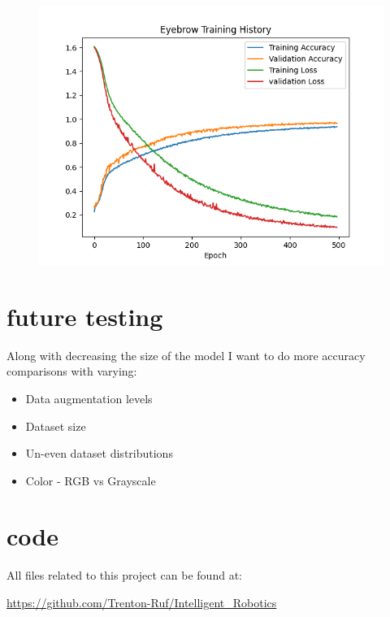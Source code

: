 \documentclass[11pt]{scrartcl} %
\begin{document}
\begin{figure}[ht!] %
	\centering
	\includegraphics[width=0.8\columnwidth]{figures/trainingGraph_RGB.png} 
	\caption{}
\end{figure}

\section{future testing}
Along with decreasing the size of the model I want to do more accuracy comparisons with varying:
\begin{itemize}
	\item Data augmentation levels
	\item Dataset size 
	\item Un-even dataset distributions
	\item Color - RGB vs Grayscale
\end{itemize}

\clearpage

\section{code}

All files related to this project can be found at: 

\url{https://github.com/Trenton-Ruf/Intelligent_Robotics}


\end{document}
